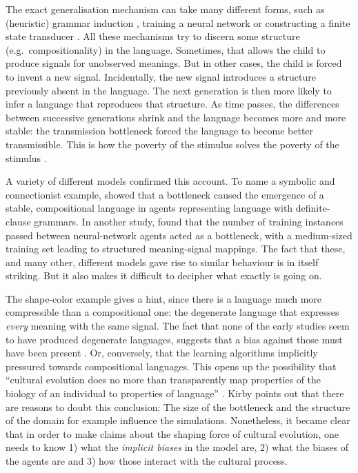 \documentclass{../src/bcthesispart}
\begin{document}
The exact generalisation mechanism can take many different forms, such as (heuristic) grammar induction \parencite{Kirby2001,Zuidema2003}, training a neural network \parencite{Kirby2002,Smith2002a} or constructing a finite state transducer \parencite{Brighton2002}.
All these mechanisms try to discern some structure (e.g.\ compositionality) in the language.
Sometimes, that allows the child to produce signals for unobserved meanings.
But in other cases, the child is forced to invent a new signal. 
Incidentally, the new signal introduces a structure previously absent in the language.
The next generation is then more likely to infer a language that reproduces that structure.
As time passes, the differences between successive generations shrink and the language becomes more and more stable:
the transmission bottleneck forced the language to become better transmissible.
This is how the poverty of the stimulus solves the poverty of the stimulus \parencite[cf.][]{Zuidema2003}.




A variety of different models confirmed this account.
To name a symbolic and connectionist example, \textcite{Kirby2001} showed that a bottleneck caused the emergence of a stable, compositional language in agents representing language with definite-clause grammars.
In another study, \textcite{Kirby2002} found that the number of training instances passed between neural-network agents acted as a bottleneck, with a medium-sized training set leading to structured meaning-signal mappings.
The fact that these, and many other, different models gave rise to similar behaviour is in itself striking.
But it also makes it difficult to decipher what exactly is going on.





The shape-color example gives a hint, since there is a language much more compressible than a compositional one: the degenerate language that expresses \emph{every} meaning with the same signal. 
The fact that none of the early studies seem to have produced degenerate languages, suggests that a bias against those must have been present \parencite{Cornish2011}.
\nocite{Culbertson2016}
Or, conversely, that the learning algorithms implicitly pressured towards compositional languages.
This opens up the possibility that “cultural evolution does no more than transparently map properties of the biology of an individual to properties of language” \parencite{Kirby2017}.
Kirby points out that there are reasons to doubt this conclusion:
The size of the bottleneck and the structure of the domain for example influence the simulations.
Nonetheless, it became clear that in order to make claims about the shaping force of cultural evolution, one needs to know 1) what the \emph{implicit biases} in the model are, 2) what the biases of the agents are and 3) how those interact with the cultural process.
\end{document}
